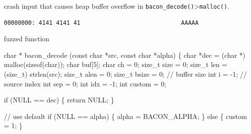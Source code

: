 \documentclass[
  a4paper,
]{scrreprt}
\newenvironment{Shaded}{\begin{snugshade}}{\end{snugshade}}
\newcommand{\CommentTok}[1]{\textcolor[rgb]{0.41,0.41,0.41}{#1}}
\newcommand{\ControlFlowTok}[1]{\textcolor[rgb]{0.85,0.12,0.09}{#1}}
\newcommand{\DataTypeTok}[1]{\textcolor[rgb]{0.47,0.16,0.63}{#1}}
\newcommand{\DecValTok}[1]{\textcolor[rgb]{0.47,0.16,0.63}{#1}}
\newcommand{\KeywordTok}[1]{\textcolor[rgb]{0.85,0.12,0.09}{#1}}
\newcommand{\NormalTok}[1]{\textcolor[rgb]{0.33,0.33,0.33}{#1}}
\newcommand{\OperatorTok}[1]{\textcolor[rgb]{0.00,0.46,0.62}{#1}}
\theoremstyle{definition}
\theoremstyle{remark}
\begin{document}
crash input that causes heap buffer overflow in
\texttt{bacon\_decode()}\textgreater{}\texttt{malloc()}.

\begin{verbatim}
00000000: 4141 4141 41                             AAAAA
\end{verbatim}

fuzzed function

\begin{Shaded}
\begin{Highlighting}[numbers=left,,]
\DataTypeTok{char} \OperatorTok{*}
\NormalTok{bacon\_decode }\OperatorTok{(}\DataTypeTok{const} \DataTypeTok{char} \OperatorTok{*}\NormalTok{src}\OperatorTok{,} \DataTypeTok{const} \DataTypeTok{char} \OperatorTok{*}\NormalTok{alpha}\OperatorTok{)} \OperatorTok{\{}
  \DataTypeTok{char} \OperatorTok{*}\NormalTok{dec }\OperatorTok{=} \OperatorTok{(}\DataTypeTok{char} \OperatorTok{*)}\NormalTok{ malloc}\OperatorTok{(}\KeywordTok{sizeof}\OperatorTok{(}\DataTypeTok{char}\OperatorTok{));}
  \DataTypeTok{char}\NormalTok{ buf}\OperatorTok{[}\DecValTok{5}\OperatorTok{];}
  \DataTypeTok{char}\NormalTok{ ch }\OperatorTok{=} \DecValTok{0}\OperatorTok{;}
  \DataTypeTok{size\_t}\NormalTok{ size }\OperatorTok{=} \DecValTok{0}\OperatorTok{;}
  \DataTypeTok{size\_t}\NormalTok{ len }\OperatorTok{=} \OperatorTok{(}\DataTypeTok{size\_t}\OperatorTok{)}\NormalTok{ strlen}\OperatorTok{(}\NormalTok{src}\OperatorTok{);}
  \DataTypeTok{size\_t}\NormalTok{ alen }\OperatorTok{=} \DecValTok{0}\OperatorTok{;}
  \DataTypeTok{size\_t}\NormalTok{ bsize }\OperatorTok{=} \DecValTok{0}\OperatorTok{;} \CommentTok{// buffer size}
  \DataTypeTok{int}\NormalTok{ i }\OperatorTok{=} \OperatorTok{{-}}\DecValTok{1}\OperatorTok{;} \CommentTok{// source index}
  \DataTypeTok{int}\NormalTok{ sep }\OperatorTok{=} \DecValTok{0}\OperatorTok{;}
  \DataTypeTok{int}\NormalTok{ idx }\OperatorTok{=} \OperatorTok{{-}}\DecValTok{1}\OperatorTok{;}
  \DataTypeTok{int}\NormalTok{ custom }\OperatorTok{=} \DecValTok{0}\OperatorTok{;}

  \ControlFlowTok{if} \OperatorTok{(}\NormalTok{NULL }\OperatorTok{==}\NormalTok{ dec}\OperatorTok{)} \OperatorTok{\{} \ControlFlowTok{return}\NormalTok{ NULL}\OperatorTok{;} \OperatorTok{\}}

  \CommentTok{// use default}
  \ControlFlowTok{if} \OperatorTok{(}\NormalTok{NULL }\OperatorTok{==}\NormalTok{ alpha}\OperatorTok{)} \OperatorTok{\{}
\NormalTok{    alpha }\OperatorTok{=}\NormalTok{ BACON\_ALPHA}\OperatorTok{;}
  \OperatorTok{\}} \ControlFlowTok{else} \OperatorTok{\{}\NormalTok{ custom }\OperatorTok{=} \DecValTok{1}\OperatorTok{;} \OperatorTok{\}}


\end{Highlighting}
\end{Shaded}
\end{document}
